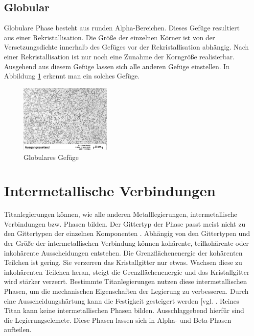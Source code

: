 \documentclass[a4paper, 11pt]{tubsreprt}
\begin{document}
\subsection{Globular}
Globulare Phase besteht aus runden Alpha-Bereichen. Dieses Gefüge resultiert aus einer Rekristallisation. Die Größe der einzelnen Körner ist von der Versetzungsdichte innerhalb des Gefüges vor der Rekristallisation abhängig. Nach einer Rekristallisation ist nur noch eine Zunahme der Korngröße realisierbar. Ausgehend aus diesem Gefüge lassen sich alle anderen Gefüge einstellen. In Abbildung \ref{globular} erkennt man ein solches Gefüge. 
\begin{figure} %
\centering
\includegraphics[width=0.4\textwidth]{Bilder/Ausgangsgefuege.jpg}
\caption{Globulares Gefüge}
\label{globular}
\end{figure}

\section{Intermetallische Verbindungen}
Titanlegierungen können, wie alle anderen Metalllegierungen, intermetallische Verbindungen bzw. Phasen bilden. Der Gittertyp der Phase passt meist nicht zu den Gittertypen der einzelnen Komponenten \cite[vgl.]{Domke1986}. Abhängig von den Gittertypen und der Größe der intermetallischen Verbindung können kohärente, teilkohärente oder inkohärente Ausscheidungen entstehen. Die Grenzflächenenergie der kohärenten Teilchen ist gering. Sie verzerren das Kristallgitter nur etwas. Wachsen diese zu inkohärenten Teilchen heran, steigt die Grenzflächenenergie und das Kristallgitter wird stärker verzerrt. 
Bestimmte Titanlegierungen nutzen diese intermetallischen Phasen, um die mechanischen Eigenschaften der Legierung zu verbesseren. Durch eine Ausscheidungshärtung kann die Festigkeit gesteigert werden [vgl. \cite{Luetjering2007}. Reines Titan kann keine intermetallischen Phasen bilden. Ausschlaggebend hierfür sind die Legierungselemete. Diese Phasen lassen sich in Alpha- und Beta-Phasen aufteilen.  
 
\end{document}
